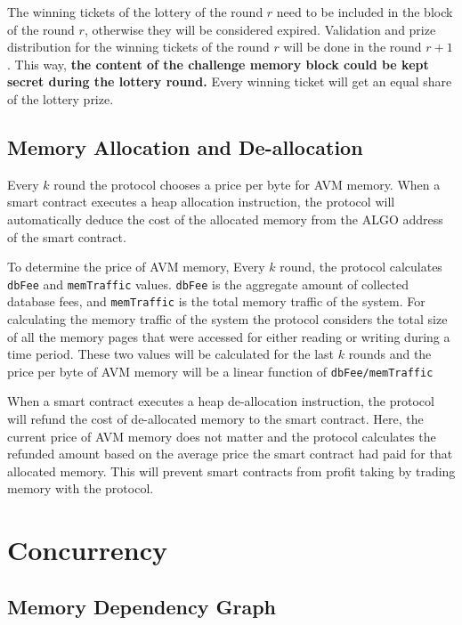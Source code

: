 \documentclass[11pt, A4]{report}
\begin{document}
    The winning tickets of the lottery of the round \(r\) need to be included in the block of the round \(r\),
    otherwise they will be considered expired. Validation and prize distribution for the winning tickets of the round
    \(r\) will be done in the round \(r + 1\). This way, \textbf{the content of the challenge memory block could be
    kept secret during the lottery round.} Every winning ticket will get an equal share of the lottery prize.

    \subsection{Memory Allocation and De-allocation}\label{subsec:memory-allocation-and-de-allocation}

    Every \(k\) round the protocol chooses a price per byte for AVM memory. When a smart contract executes a heap
    allocation instruction, the protocol will automatically deduce the cost of the allocated memory from the ALGO
    address of the smart contract.

    To determine the price of AVM memory, Every \(k\) round, the protocol calculates \texttt{dbFee} and
    \texttt{memTraffic} values. \texttt{dbFee} is the aggregate amount of collected database fees, and
    \texttt{memTraffic} is the total memory traffic of the system. For calculating the memory traffic of the system
    the protocol considers the total size of all the memory pages that were accessed for either reading or writing
    during a time period. These two values will be calculated for the last \(k\) rounds and the price per byte of
    AVM memory will be a linear function of \texttt{dbFee/memTraffic}

    When a smart contract executes a heap de-allocation instruction, the protocol will refund the cost of
    de-allocated memory to the smart contract. Here, the current price of AVM memory does not matter and the protocol
    calculates the refunded amount based on the average price the smart contract had paid for that allocated memory.
    This will prevent smart contracts from profit taking by trading memory with the protocol.


    \section{Concurrency}\label{sec:concurrency}

    \subsection{Memory Dependency Graph}\label{subsec:memory-dependency-graph}
\end{document}
